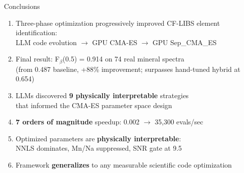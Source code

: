 \documentclass[aspectratio=169,12pt]{beamer}
\begin{document}
\begin{frame}{Conclusions}
  \begin{enumerate}
    \item Three-phase optimization progressively improved CF-LIBS element identification:\\
          LLM code evolution $\to$ GPU CMA-ES $\to$ GPU Sep\_CMA\_ES

    \vspace{0.3em}
    \item Final result: \alert{F$_\beta$(0.5) = 0.914} on 74 real mineral spectra\\
          {\small (from 0.487 baseline, \alert{+88\%} improvement; surpasses hand-tuned hybrid at 0.654)}

    \vspace{0.3em}
    \item LLMs discovered \textbf{9 physically interpretable} strategies\\
          that informed the CMA-ES parameter space design

    \vspace{0.3em}
    \item \textbf{7 orders of magnitude} speedup: 0.002 $\to$ 35{,}300 evals/sec

    \vspace{0.3em}
    \item Optimized parameters are \textbf{physically interpretable}:\\
          NNLS dominates, Mn/Na suppressed, SNR gate at 9.5

    \vspace{0.3em}
    \item Framework \textbf{generalizes} to any measurable scientific code optimization
  \end{enumerate}
\end{frame}
\end{document}
